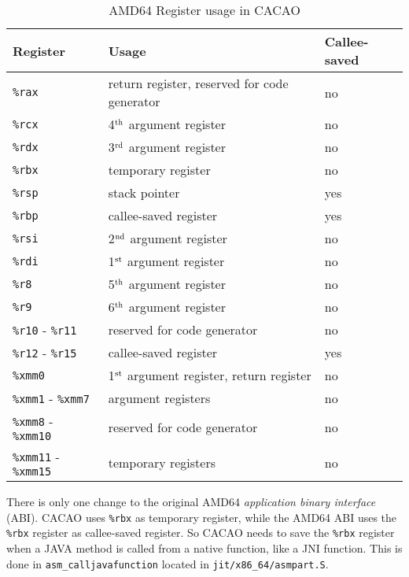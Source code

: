 \begin{table}
\begin{center}
\begin{tabular}{l|l|l}
Register       & Usage                                         & Callee-saved \\ \hline
\texttt{\%rax} & return register, reserved for code generator  & no           \\
\texttt{\%rcx} & 4$^{\rm th}$ argument register                & no           \\
\texttt{\%rdx} & 3$^{\rm rd}$ argument register                & no           \\
\texttt{\%rbx} & temporary register                            & no           \\
\texttt{\%rsp} & stack pointer                                 & yes          \\
\texttt{\%rbp} & callee-saved register                         & yes          \\
\texttt{\%rsi} & 2$^{\rm nd}$ argument register                & no           \\
\texttt{\%rdi} & 1$^{\rm st}$ argument register                & no           \\
\texttt{\%r8}  & 5$^{\rm th}$ argument register                & no           \\
\texttt{\%r9}  & 6$^{\rm th}$ argument register                & no           \\
\texttt{\%r10} - \texttt{\%r11} & reserved for code generator  & no           \\
\texttt{\%r12} - \texttt{\%r15} & callee-saved register        & yes          \\
\texttt{\%xmm0} & 1$^{\rm st}$ argument register, return register & no        \\
\texttt{\%xmm1} - \texttt{\%xmm7} & argument registers         & no           \\
\texttt{\%xmm8} - \texttt{\%xmm10} & reserved for code generator & no         \\
\texttt{\%xmm11} - \texttt{\%xmm15} & temporary registers      & no           \\
\end{tabular}
\caption{AMD64 Register usage in CACAO}
\label{amd64registerusage}
\end{center}
\end{table}

There is only one change to the original AMD64 \textit{application
binary interface} (ABI). CACAO uses \texttt{\%rbx} as temporary
register, while the AMD64 ABI uses the \texttt{\%rbx} register as
callee-saved register. So CACAO needs to save the \texttt{\%rbx}
register when a JAVA method is called from a native function, like a
JNI function. This is done in \texttt{asm\_calljavafunction} located in
\texttt{jit/x86\_64/asmpart.S}.

